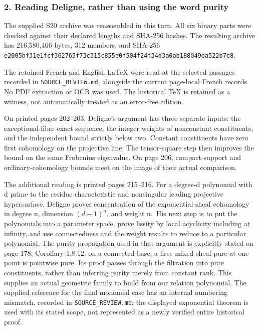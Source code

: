 \subsubsection{2. Reading Deligne, rather than using the word purity}\label{endpoint-exponential_original--reading-deligne-rather-than-using-the-word-purity}

The supplied S20 archive was reassembled in this turn. All six binary parts were checked against their declared lengths and SHA-256 hashes. The resulting archive has 216,580,466 bytes, 312 members, and SHA-256 \nolinkurl{e2005bf31e1fcf362765f73c315c855e0f504f24f34d3a0ab188049da522b7c8}.

The retained French and English LaTeX were read at the selected passages recorded in \nolinkurl{SOURCE_REVIEW.md}, alongside the current page-local French records. No PDF extraction or OCR was used. The historical TeX is retained as a witness, not automatically treated as an error-free edition.

On printed pages 202--203, Deligne's argument has three separate inputs: the exceptional-fibre exact sequence, the integer weights of nonconstant constituents, and the independent bound strictly below two. Constant constituents have zero first cohomology on the projective line. The tensor-square step then improves the bound on the same Frobenius eigenvalue. On page 206, compact-support and ordinary-cohomology bounds meet on the image of their actual comparison.

The additional reading is printed pages 215--216. For a degree-d polynomial with d prime to the residue characteristic and nonsingular leading projective hypersurface, Deligne proves concentration of the exponential-sheaf cohomology in degree n, dimension \((d-1)^n\), and weight n.~His next step is to put the polynomials into a parameter space, prove lissity by local acyclicity including at infinity, and use connectedness and the weight results to reduce to a particular polynomial. The purity propagation used in that argument is explicitly stated on page 178, Corollary 1.8.12: on a connected base, a lisse mixed sheaf pure at one point is pointwise pure. Its proof passes through the filtration into pure constituents, rather than inferring purity merely from constant rank. This supplies an actual geometric family to build from our relation polynomial. The supplied reference for the final monomial case has an internal numbering mismatch, recorded in \nolinkurl{SOURCE_REVIEW.md}; the displayed exponential theorem is used with its stated scope, not represented as a newly verified entire historical proof.

